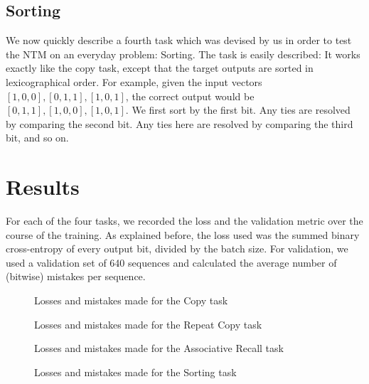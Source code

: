 \documentclass[12pt,twoside]{article}
\newcommand{\taskFigure}[1]{{\centering{
\makebox[\textwidth][c]{\texttt{[image: \#1]}}
}}}
\theoremstyle{plain}
\theoremstyle{definition}
\theoremstyle{remark}
\begin{document}
\subsection{Sorting}
We now quickly describe a fourth task which was devised by us in order to test the NTM on an everyday problem: Sorting. The task is easily described: It works exactly like the copy task, except that the target outputs are sorted in lexicographical order. For example, given the input vectors $[1, 0, 0], [0, 1, 1], [1, 0, 1]$, the correct output would be $[0, 1, 1], [1, 0, 0],  [1, 0, 1]$. We first sort by the first bit. Any ties are resolved by comparing the second bit. Any ties here are resolved by comparing the third bit, and so on.

\section{Results}
For each of the four tasks, we recorded the loss and the validation metric over the course of the training. As explained before, the loss used was the summed binary cross-entropy of every output bit, divided by the batch size. For validation, we used a validation set of 640 sequences and calculated the average number of (bitwise) mistakes per sequence.

\begin{figure}\label{fig-copy}
\taskFigure{src/copy_task.pdf}
 \caption{Losses and mistakes made for the Copy task}
\end{figure}

\begin{figure}\label{fig-repeat-copy}
\taskFigure{src/repeat_copy_task.pdf}
\caption{Losses and mistakes made for the Repeat Copy task}
\end{figure}

\begin{figure}\label{fig-assoc}
\taskFigure{src/associative_recall_task.pdf}
\caption{Losses and mistakes made for the Associative Recall task}
\end{figure}

\begin{figure}\label{fig-sort}
\taskFigure{src/sorting_task.pdf}
\caption{Losses and mistakes made for the Sorting task}
\end{figure}
\end{document}
